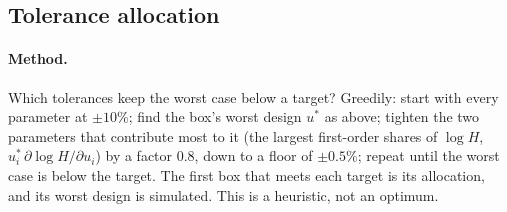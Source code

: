 \documentclass[11pt,a4paper]{article}
\begin{document}
\subsection{Tolerance allocation}
\label{sec:allocation}

\paragraph{Method.} Which tolerances keep the worst case below a target? Greedily: start with
every parameter at $\pm10\%$; find the box's worst design $u^*$ as above; tighten the two
parameters that contribute most to it (the largest first-order shares of $\log H$,
$u^*_i\,\partial\log H/\partial u_i$) by a factor $0.8$, down to a floor of $\pm0.5\%$; repeat
until the worst case is below the target. The first box that meets each target is its
allocation, and its worst design is simulated. This is a heuristic, not an optimum.
\end{document}
